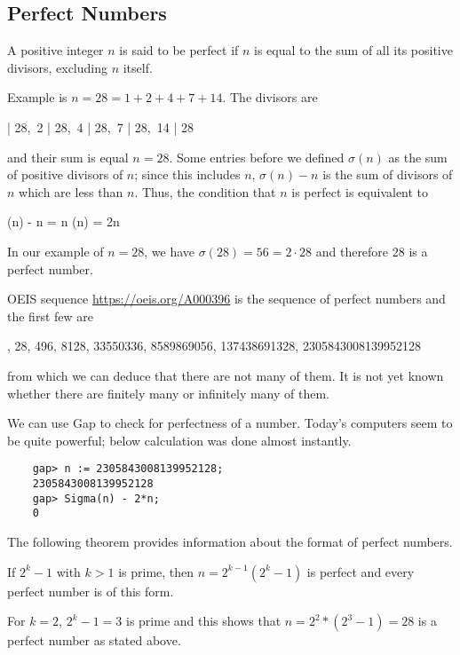 
\subsection{Perfect Numbers}

A positive integer $n$ is said to be perfect if $n$ is equal to the sum of all its positive divisors, excluding $n$ itself.

Example is $n = 28 = 1 + 2 + 4 + 7 + 14$. The divisors are

 | 28,\, 2 | 28,\, 4 | 28,\, 7 | 28,\, 14 | 28
\eee

and their sum is equal $n=28$. Some entries before we defined $\sigma(n)$ as the sum of positive divisors of $n$; since this includes $n$, $\sigma(n) - n$ is the sum of divisors of $n$ which are less than $n$. Thus, the condition that $n$ is perfect is equivalent to

\bee
\sigma(n) - n = n \rightarrow \sigma(n) = 2n
\eee

In our example of $n = 28$, we have $\sigma(28) = 56 = 2 \cdot 28$ and therefore $28$ is a perfect number.

OEIS sequence \href{A000386}{https://oeis.org/A000396} is the sequence of perfect numbers and the first few are

, 28, 496, 8128, 33550336, 8589869056, 137438691328, 2305843008139952128
\eee

from which we can deduce that there are not many of them. It is not yet known whether there are ﬁnitely many or inﬁnitely many of them.

We can use Gap to check for perfectness of a number. Today's computers seem to be quite powerful; below calculation was done almost instantly.

\begin{verbatim}
    gap> n := 2305843008139952128;
    2305843008139952128
    gap> Sigma(n) - 2*n;
    0
\end{verbatim}


The following theorem provides information about the format of perfect numbers.

\begin{theorem}
    If $2^k - 1$ with $k > 1$ is prime, then $n = 2^{k-1}(2^k-1)$ is perfect and every perfect number is of this form.
\end{theorem}

For $k=2$, $2^k-1 = 3$ is prime and this shows that $n=2^2*(2^3-1) = 28$ is a perfect number as stated above.

